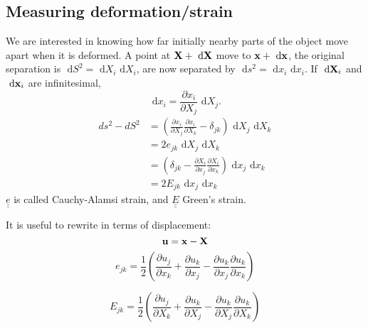 \documentclass[12pt]{article}
\newcommand{\xx}{{\bf x}}
\newcommand{\uu}{{\bf u}}
\newcommand{\bX}{{\bf X}}
\newcommand{\dx}[1]{\text{ d}#1}
\begin{document}
\subsection{Measuring deformation/strain}
We are interested in knowing how far initially nearby parts of the object move apart when it is deformed.  A point at $\bX + \dx{\bX}$ move to $\xx + \dx{\xx}$, the original separation is $\dx{S}^2 = \dx{X_i}\dx{X_i}$, are now separated by $\dx{s}^2 = \dx{x_i}\dx{x_i}$.
If $\dx{\bX_i}$ and $\dx{\xx_i}$ are infinitesimal,
\[
\dx{x_i}  = \frac{\partial x_i}{\partial X_j} \dx{X_j}.
\]
\begin{align*}
ds^2 - dS^2 &= ( \frac{\partial x_i}{\partial X_j}  \frac{\partial x_i}{\partial X_k}  - \delta_{jk} )\dx{X_j} \dx{X_k} \\
&=  2 e_{jk} \dx{X_j} \dx{X_k}\\
&= ( \delta_{jk} -  \frac{\partial X_i}{\partial x_j}  \frac{\partial X_i}{\partial x_k} )\dx{x_j}\dx{x_k}\\
&=  2 E_{jk} \dx{x_j} \dx{x_k}\
\end{align*}
$\underline{\underline e}$ is called Cauchy-Alamsi strain, and $\underline{\underline E}$  Green's strain.

It is useful to rewrite in terms of displacement:
\[
\uu = \xx - \bX
\]
\[
e_{jk} = \frac 1 2 ( \frac{\partial u_j}{\partial x_k}  +  \frac{\partial u_k}{\partial x_j} -  \frac{\partial u_k}{\partial x_j} \frac{\partial u_k}{\partial x_k}      )
\]

\[
E_{jk} = \frac 1 2 ( \frac{\partial u_j}{\partial X_k}  +  \frac{\partial u_k}{\partial X_j} -  \frac{\partial u_k}{\partial X_j} \frac{\partial u_k}{\partial X_k}      )
\]
\end{document}
